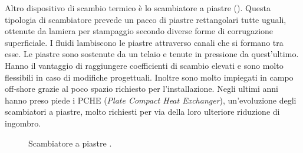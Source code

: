 Altro dispositivo di scambio termico è lo scambiatore a piastre (). Questa tipologia di scambiatore prevede un pacco di piastre rettangolari tutte uguali, ottenute da lamiera per stampaggio secondo diverse forme di corrugazione superficiale. I fluidi lambiscono le piastre attraverso canali che si formano tra esse. Le piastre sono sostenute da un telaio e tenute in pressione da quest'ultimo. Hanno il vantaggio di raggiungere coefficienti di scambio elevati e sono molto flessibili in caso di modifiche progettuali. Inoltre sono molto impiegati in campo off-shore grazie al poco spazio richiesto per l'installazione. Negli ultimi anni hanno preso piede i PCHE (\textit{Plate Compact Heat Exchanger}), un'evoluzione degli scambiatori a piastre, molto richiesti per via della loro ulteriore riduzione di ingombro.\\

\begin{figure}[htbp]
    \centering
     \qquad
\caption{Scambiatore a piastre \parencite{guadagni2003prontuario}.}
\label{fig:piastre}
\end{figure}

